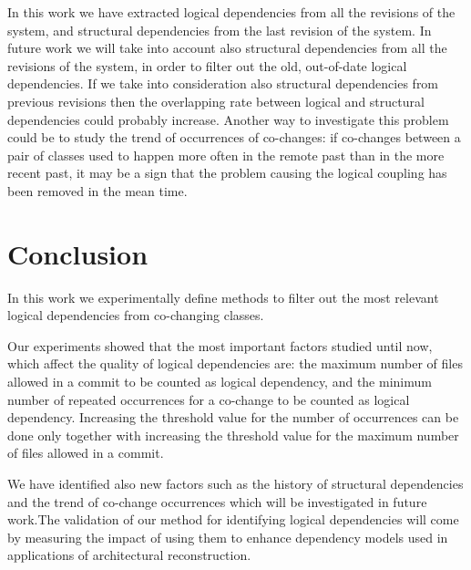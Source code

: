 \documentclass[conference]{IEEEtran}
\begin{document}
In this work we have extracted logical dependencies from all the revisions of the system, and structural dependencies from the last revision of the system. In future work we will take into account also structural dependencies from all the revisions of the system, in order to filter out the old, out-of-date logical dependencies. If we take into consideration also structural dependencies from previous revisions then the overlapping rate between logical and structural dependencies could probably increase. Another way to investigate this problem could be to study the trend of occurrences of co-changes: if co-changes between a pair of classes used to happen more often in the remote past than in the more recent past, it may be a sign that the problem causing the logical coupling has been removed in the mean time. 


\section{Conclusion}
\label{sec:Conclusion}
   
In this work we experimentally define methods to filter out the most relevant logical dependencies from co-changing classes. 

Our experiments showed that the most important factors studied until now, which affect the quality of logical dependencies are: the maximum number of files allowed in a commit to be counted as logical dependency, and the minimum number of repeated occurrences for a co-change to be counted as logical dependency. Increasing the threshold value for the number of occurrences can be done only together with increasing the threshold value for the maximum number of files allowed in a commit.

We have identified also new factors such as the history of structural dependencies and the trend of co-change occurrences which will be investigated in future work.The validation of our method for identifying logical dependencies will come by measuring the impact of using them to enhance dependency models used in applications of architectural reconstruction.




%
\end{document}
